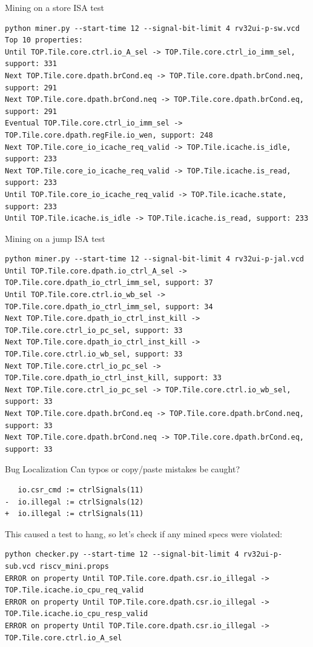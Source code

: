 \documentclass[12pt,aspectratio=169]{beamer}
\begin{document}
\begin{frame}[fragile]{Mining on a store ISA test}
  \begin{verbatim}
python miner.py --start-time 12 --signal-bit-limit 4 rv32ui-p-sw.vcd
Top 10 properties:
Until TOP.Tile.core.ctrl.io_A_sel -> TOP.Tile.core.ctrl_io_imm_sel, support: 331
Next TOP.Tile.core.dpath.brCond.eq -> TOP.Tile.core.dpath.brCond.neq, support: 291
Next TOP.Tile.core.dpath.brCond.neq -> TOP.Tile.core.dpath.brCond.eq, support: 291
Eventual TOP.Tile.core.ctrl_io_imm_sel -> TOP.Tile.core.dpath.regFile.io_wen, support: 248
Next TOP.Tile.core_io_icache_req_valid -> TOP.Tile.icache.is_idle, support: 233
Next TOP.Tile.core_io_icache_req_valid -> TOP.Tile.icache.is_read, support: 233
Until TOP.Tile.core_io_icache_req_valid -> TOP.Tile.icache.state, support: 233
Until TOP.Tile.icache.is_idle -> TOP.Tile.icache.is_read, support: 233
  \end{verbatim}
\end{frame}

\begin{frame}[fragile]{Mining on a jump ISA test}
  \begin{verbatim}
python miner.py --start-time 12 --signal-bit-limit 4 rv32ui-p-jal.vcd
Until TOP.Tile.core.dpath.io_ctrl_A_sel -> TOP.Tile.core.dpath_io_ctrl_imm_sel, support: 37
Until TOP.Tile.core.ctrl.io_wb_sel -> TOP.Tile.core.dpath_io_ctrl_imm_sel, support: 34
Next TOP.Tile.core.dpath_io_ctrl_inst_kill -> TOP.Tile.core.ctrl_io_pc_sel, support: 33
Next TOP.Tile.core.dpath_io_ctrl_inst_kill -> TOP.Tile.core.ctrl.io_wb_sel, support: 33
Next TOP.Tile.core.ctrl_io_pc_sel -> TOP.Tile.core.dpath_io_ctrl_inst_kill, support: 33
Next TOP.Tile.core.ctrl_io_pc_sel -> TOP.Tile.core.ctrl.io_wb_sel, support: 33
Next TOP.Tile.core.dpath.brCond.eq -> TOP.Tile.core.dpath.brCond.neq, support: 33
Next TOP.Tile.core.dpath.brCond.neq -> TOP.Tile.core.dpath.brCond.eq, support: 33
  \end{verbatim}
\end{frame}

\begin{frame}[fragile]{Bug Localization}
Can typos or copy/paste mistakes be caught?
  \begin{verbatim}
   io.csr_cmd := ctrlSignals(11)
-  io.illegal := ctrlSignals(12)
+  io.illegal := ctrlSignals(11)
  \end{verbatim}

  This caused a test to hang, so let's check if any mined specs were violated:
  \begin{verbatim}
python checker.py --start-time 12 --signal-bit-limit 4 rv32ui-p-sub.vcd riscv_mini.props
ERROR on property Until TOP.Tile.core.dpath.csr.io_illegal -> TOP.Tile.icache.io_cpu_req_valid
ERROR on property Until TOP.Tile.core.dpath.csr.io_illegal -> TOP.Tile.icache.io_cpu_resp_valid
ERROR on property Until TOP.Tile.core.dpath.csr.io_illegal -> TOP.Tile.core.ctrl.io_A_sel
  \end{verbatim}
\end{frame}
\end{document}

